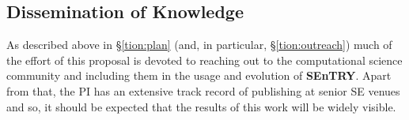 \documentclass{NSF}
\newcommand{\tion}[1]{\S\ref{tion:#1}}
\newcommand{\IT}{{\bf {\sffamily SEnTRY}}}
\begin{document}
\begin{nsfdescription}




%
\subsection{Dissemination of Knowledge}
As described above in \tion{plan} (and, in particular, \tion{outreach}) much of the effort
of this proposal is devoted to reaching out to
the computational science community and including them
in the usage and evolution of {\IT}. 
Apart from that, the PI has  an extensive track record of publishing at senior SE venues and so, it should be expected that the results of this work will be widely visible.


\end{nsfdescription}
\end{document}
